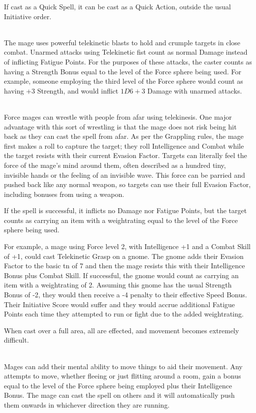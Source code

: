 \begin{multicols}{2}
If cast as a Quick Spell, it can be cast as a Quick Action, outside the usual Initiative order.

\\
The mage uses powerful telekinetic blasts to hold and crumple targets in close combat.
Unarmed attacks using Telekinetic fist count as normal Damage instead of inflicting Fatigue Points.
For the purposes of these attacks, the caster counts as having a Strength Bonus equal to the level of the Force sphere being used.
For example, someone employing the third level of the Force sphere would count as having +3 Strength, and would inflict $1D6+3$ Damage with unarmed attacks.

\\
Force mages can wrestle with people from afar using telekinesis. One major advantage with this sort of wrestling is that the mage does not risk being hit back as they can cast the spell from afar. As per the Grappling rules, the mage first makes a roll to capture the target; they roll Intelligence and Combat while the target resists with their current Evasion Factor. Targets can literally feel the force of the mage's mind around them, often described as a hundred tiny, invisible hands or the feeling of an invisible wave. This force can be parried and pushed back like any normal weapon, so targets can use their full Evasion Factor, including bonuses from using a weapon.

If the spell is successful, it inflicts no Damage nor Fatigue Points, but the target counts as carrying an item with a \gls{weightrating} equal to the level of the Force sphere being used.

For example, a mage using Force level 2, with Intelligence +1 and a Combat Skill of +1, could cast Telekinetic Grasp on a gnome.
The gnome adds their Evasion Factor to the basic \gls{tn} of 7 and then the mage resists this with their Intelligence Bonus plus Combat Skill.
If successful, the gnome would count as carrying an item with a \gls{weightrating} of 2.
Assuming this gnome has the usual Strength Bonus of -2, they would then receive a -4 penalty to their effective Speed Bonus.
Their Initiative Score would suffer and they would accrue additional Fatigue Points each time they attempted to run or fight due to the added \gls{weightrating}.

When cast over a full area, all are effected, and movement becomes extremely difficult.

\\
Mages can add their mental ability to move things to aid their movement.
Any attempts to move, whether fleeing or just flitting around a room, gain a bonus equal to the level of the Force sphere being employed plus their Intelligence Bonus.
The mage can cast the spell on others and it will automatically push them onwards in whichever direction they are running.

\end{multicols}

